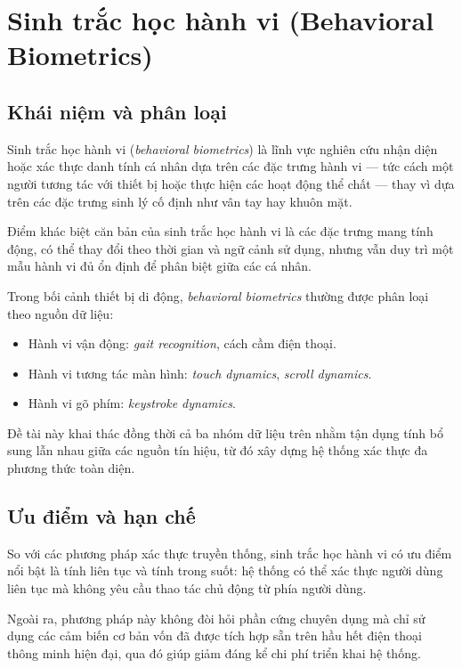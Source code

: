 \documentclass[../DoAn.tex]{subfiles}
\begin{document}
    \section{Sinh trắc học hành vi (Behavioral Biometrics)}

    \subsection{Khái niệm và phân loại}

    Sinh trắc học hành vi (\textit{behavioral biometrics}) là lĩnh vực nghiên cứu nhận diện hoặc xác thực danh tính cá nhân dựa trên các đặc trưng hành vi --- tức cách một người tương tác với thiết bị hoặc thực hiện các hoạt động thể chất --- thay vì dựa trên các đặc trưng sinh lý cố định như vân tay hay khuôn mặt.
    
    Điểm khác biệt căn bản của sinh trắc học hành vi là các đặc trưng mang tính động, có thể thay đổi theo thời gian và ngữ cảnh sử dụng, nhưng vẫn duy trì một mẫu hành vi đủ ổn định để phân biệt giữa các cá nhân.
    
    Trong bối cảnh thiết bị di động, \textit{behavioral biometrics} thường được phân loại theo nguồn dữ liệu:
    \begin{itemize}
        \item Hành vi vận động: \textit{gait recognition}, cách cầm điện thoại.
        
        \item Hành vi tương tác màn hình: \textit{touch dynamics}, \textit{scroll dynamics}.
        
        \item Hành vi gõ phím: \textit{keystroke dynamics}.
    \end{itemize}
    
    Đề tài này khai thác đồng thời cả ba nhóm dữ liệu trên nhằm tận dụng tính bổ sung lẫn nhau giữa các nguồn tín hiệu, từ đó xây dựng hệ thống xác thực đa phương thức toàn diện.
    
    \subsection{Ưu điểm và hạn chế}
    
    So với các phương pháp xác thực truyền thống, sinh trắc học hành vi có ưu điểm nổi bật là tính liên tục và tính trong suốt: hệ thống có thể xác thực người dùng liên tục mà không yêu cầu thao tác chủ động từ phía người dùng.
    
    Ngoài ra, phương pháp này không đòi hỏi phần cứng chuyên dụng mà chỉ sử dụng các cảm biến cơ bản vốn đã được tích hợp sẵn trên hầu hết điện thoại thông minh hiện đại, qua đó giúp giảm đáng kể chi phí triển khai hệ thống.
    
\end{document}
